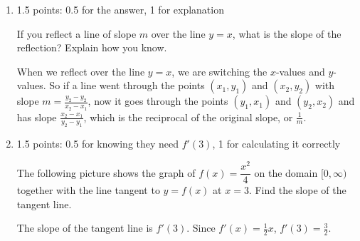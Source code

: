 \documentclass{article}
\begin{document}
\begin{enumerate}
\begin{enumerate}
  \item

    \begin{grading}
      1.5 points: 0.5 for the answer, 1 for explanation
    \end{grading}

    \begin{problem}[\nstretch{0.75}]
      If you reflect a line of slope $m$ over the line $y = x$, what is the slope of the reflection? Explain how you know.
    \end{problem}

    \begin{solution}
      When we reflect over the line $y=x$, we are switching the $x$-values
      and $y$-values. So if a line went through the points $(x_1, y_1)$
      and $(x_2, y_2)$ with slope $m=\frac{y_2-y_2}{x_2-x_1}$, 
      now it goes through the points $(y_1, x_1)$ and $(y_2, x_2)$
      and has slope $\frac{x_2-x_1}{y_2-y_1}$, which is the reciprocal
      of the original slope, or $\frac{1}{m}$.
    \end{solution}

  \item

    \begin{grading}
      1.5 points: 0.5 for knowing they need $f'(3)$, 1 for calculating it correctly 
    \end{grading}

    \begin{problem}[0.25in]
      The following picture shows the graph of $f(x) = \dfrac{x^2}{4}$ on the domain $[0, \infty)$ together with the line tangent to $y = f(x)$ at $x = 3$. Find the slope of the tangent line.

    \end{problem}

    \begin{solution}
      The slope of the tangent line is $f'(3)$. Since 
      $f'(x) = \tfrac{1}{2}x$, $f'(3)=\frac{3}{2}$.
    \end{solution}


\end{enumerate}
\end{enumerate}
\end{document}
